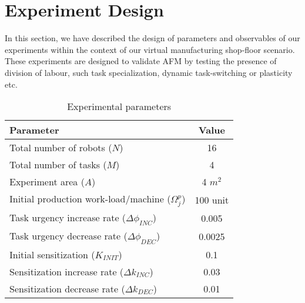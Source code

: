 \section{Experiment Design}
\label{sec:expt-design}
In this section, we have described the design of parameters and observables of our experiments within the context of our virtual manufacturing shop-floor scenario. 
These experiments are designed to validate AFM by testing the presence of division of labour, such task specialization, dynamic task-switching or plasticity etc. 
\begin{table}
\caption{Experimental parameters}
\label{table:params}
\begin{center}
\begin{tabular}{|l||c|}
\hline Parameter & Value\\
\hline Total number of robots ($N$) & 16\\
\hline Total number of tasks ($M$) & 4\\
\hline Experiment area ($A$) & 4 $m^2$\\
\hline Initial production work-load/machine ($\Omega_{j}^{p}$) & 100 unit\\
\hline Task urgency increase rate ($\Delta\phi_{INC}$) & 0.005\\
\hline Task urgency decrease rate ($\Delta\phi_{DEC}$) & 0.0025\\
\hline Initial sensitization ($K_{INIT}$) & 0.1\\
\hline Sensitization increase rate ($\Delta k_{INC}$) & 0.03\\
\hline Sensitization decrease rate ($\Delta k_{DEC}$) & 0.01\\
\hline
\end{tabular}
\end{center}
\end{table}
% 
